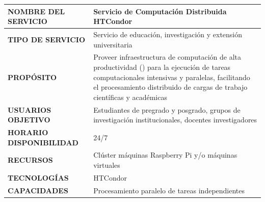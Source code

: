 \begin{table}[H]
	\centering
	\renewcommand{\arraystretch}{1.2}
	\setlength{\tabcolsep}{3pt}
	\tiny
	\begin{tabularx}{\textwidth}{|>{\raggedright\arraybackslash}p{}|X|}
		\hline
		\textbf{NOMBRE DEL SERVICIO}    & Servicio de Computación Distribuida HTCondor                                                                                                                                                                                   \\
		\hline
		\textbf{TIPO DE SERVICIO}       & Servicio de educación, investigación y extensión universitaria                                                                                                                                                                 \\
		\hline
		\textbf{PROPÓSITO}              & Proveer infraestructura de computación de alta productividad (\HTC) para la ejecución de tareas computacionales intensivas y paralelas, facilitando el procesamiento distribuido de cargas de trabajo científicas y académicas \\
		\hline
		\textbf{USUARIOS OBJETIVO}      & Estudiantes de pregrado y posgrado, grupos de investigación institucionales, docentes investigadores                                                                                                                           \\
		\hline
		\textbf{HORARIO DISPONIBILIDAD} & 24/7                                                                                                                                                                                                                           \\
		\hline
		\textbf{RECURSOS}               & Clúster máquinas Raspberry Pi y/o máquinas virtuales                                                                                                                                                                           \\
		\hline
		\textbf{TECNOLOGÍAS}            & HTCondor                                                                                                                                                                                                                       \\
		\hline
		\textbf{CAPACIDADES}            & Procesamiento paralelo de tareas independientes                                                                                                                                                                                \\

\end{tabularx}
\end{table}

